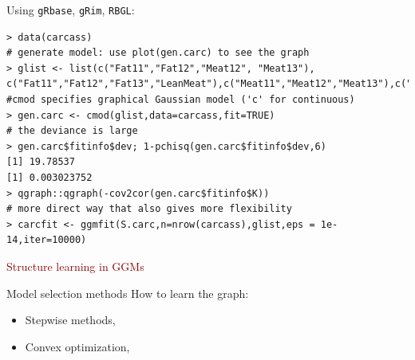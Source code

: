 \documentclass[11pt,handout,aspectratio=169,dvipsnames]{beamer}
\begin{document}
\begin{frame}[fragile]{}
	Using \texttt{gRbase}, \texttt{gRim}, \texttt{RBGL}:
\begin{lstlisting}
> data(carcass)
# generate model: use plot(gen.carc) to see the graph
> glist <- list(c("Fat11","Fat12","Meat12", "Meat13"), c("Fat11","Fat12","Fat13","LeanMeat"),c("Meat11","Meat12","Meat13"),c("Meat11","Fat13","LeanMeat"))
#cmod specifies graphical Gaussian model ('c' for continuous)
> gen.carc <- cmod(glist,data=carcass,fit=TRUE)
# the deviance is large
> gen.carc$fitinfo$dev; 1-pchisq(gen.carc$fitinfo$dev,6)
[1] 19.78537
[1] 0.003023752
> qgraph::qgraph(-cov2cor(gen.carc$fitinfo$K))
# more direct way that also gives more flexibility
> carcfit <- ggmfit(S.carc,n=nrow(carcass),glist,eps = 1e-14,iter=10000)

  \end{lstlisting}
\end{frame}

\begin{frame}{}
\begin{center}
	{\huge \textcolor{DarkRed}{Structure learning in GGMs}}
\end{center}
\end{frame}

\begin{frame}{Model selection methods}
How to learn the graph:\\[.4cm]
\begin{itemize}
	\item Stepwise methods,\\[.4cm]
	\item Convex optimization,\\[.4cm]
\end{itemize}	
\end{frame}
\end{document}
